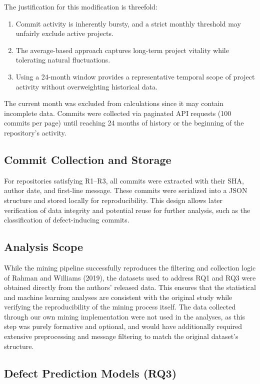 \documentclass[conference]{IEEEtran}
\begin{document}
	The justification for this modification is threefold:
	\begin{enumerate}
		\item Commit activity is inherently bursty, and a strict monthly threshold may unfairly exclude active projects.
		\item The average-based approach captures long-term project vitality while tolerating natural fluctuations.
		\item Using a 24-month window provides a representative temporal scope of project activity without overweighting historical data.
	\end{enumerate}
	
	The current month was excluded from calculations since it may contain incomplete data. Commits were collected via paginated API requests (100 commits per page) until reaching 24 months of history or the beginning of the repository's activity.
	
	\subsection{Commit Collection and Storage}
	For repositories satisfying R1–R3, all commits were extracted with their SHA, author date, and first-line message. These commits were serialized into a JSON structure and stored locally for reproducibility. This design allows later verification of data integrity and potential reuse for further analysis, such as the classification of defect-inducing commits.
	
	\subsection{Analysis Scope}
	While the mining pipeline successfully reproduces the filtering and collection logic of Rahman and Williams (2019), the datasets used to address RQ1 and RQ3 were obtained directly from the authors’ released data. This ensures that the statistical and machine learning analyses are consistent with the original study while verifying the reproducibility of the mining process itself. The data collected through our own mining implementation were not used in the analyses, as this step was purely formative and optional, and would have additionally required extensive preprocessing and message filtering to match the original dataset’s structure.
	\subsection{Defect Prediction Models (RQ3)}
	
\end{document}
